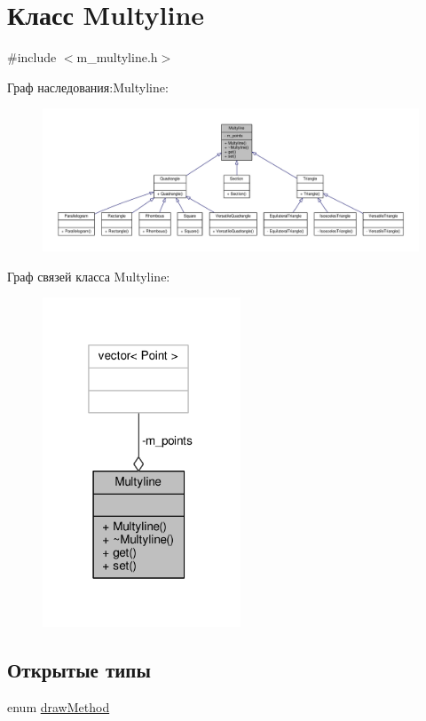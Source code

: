 \hypertarget{class_multyline}{\section{Класс Multyline}
\label{class_multyline}
}


{\ttfamily \#include $<$m\-\_\-multyline.\-h$>$}



Граф наследования\-:Multyline\-:
\nopagebreak
\begin{figure}[H]
\begin{center}
\leavevmode
\includegraphics[width=350pt]{class_multyline__inherit__graph}
\end{center}
\end{figure}


Граф связей класса Multyline\-:
\nopagebreak
\begin{figure}[H]
\begin{center}
\leavevmode
\includegraphics[width=167pt]{class_multyline__coll__graph}
\end{center}
\end{figure}
\subsection*{Открытые типы}
\begin{DoxyCompactItemize}
\item 
enum \hyperlink{class_multyline_ad75d7bb224267d0d7b4c40fd72a1d920}{draw\-Method} 
\end{DoxyCompactItemize}
